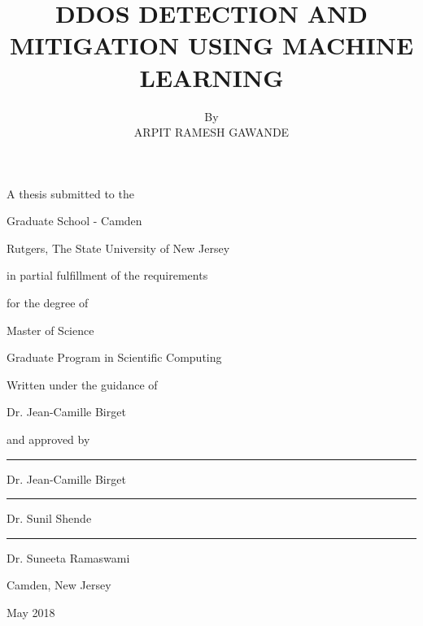 \documentclass[12pt,oneside,a4paper]{article}
\title{\normalsize DDOS DETECTION AND MITIGATION USING MACHINE LEARNING}
\author{\normalsize By \\ \normalsize ARPIT RAMESH GAWANDE}
\date{}
\begin{document}
\begin{titlepage}
  \centering
  \maketitle
  A thesis submitted to the\par
  Graduate School - Camden\par
  Rutgers, The State University of New Jersey\par
  in partial fulfillment of the requirements\par
  for the degree of \par
  Master of Science\par
  Graduate Program in Scientific Computing\par
  Written under the guidance of\par
  Dr. Jean-Camille Birget\par
  and approved by\par
  \vspace{3mm}
  \noindent\rule{6cm}{0.4pt} \par
  Dr. Jean-Camille Birget\par
  \vspace{3mm}
  \noindent\rule{6cm}{0.4pt} \par
  Dr. Sunil Shende\par
  \vspace{3mm}
  \noindent\rule{6cm}{0.4pt} \par
  Dr. Suneeta Ramaswami\par
  \vfill
  Camden, New Jersey\par
  {May 2018}
\end{titlepage}
\end{document}
